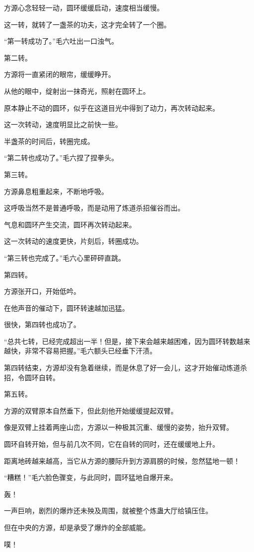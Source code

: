 \begin{this_body}
方源心念轻轻一动，圆环缓缓启动，速度相当缓慢。

这一转，就转了一盏茶的功夫，这才完全转了一个圈。

“第一转成功了。”毛六吐出一口浊气。

第二转。

方源将一直紧闭的眼帘，缓缓睁开。

从他的眼中，绽射出一抹奇光，照射在圆环上。

原本静止不动的圆环，似乎在这道目光中得到了动力，再次转动起来。

这一次转动，速度明显比之前快一些。

半盏茶的时间后，转圈完成。

“第二转也成功了。”毛六捏了捏拳头。

第三转。

方源鼻息粗重起来，不断地呼吸。

这呼吸当然不是普通呼吸，而是动用了炼道杀招催谷而出。

气息和圆环产生交流，圆环再次转动起来。

这一次转动的速度更快，片刻后，转圈成功。

“第三转也完成了。”毛六心里砰砰直跳。

第四转。

方源张开口，开始低吟。

在他声音的催动下，圆环转速越加迅猛。

很快，第四转也成功了。

“总共七转，已经完成超出一半！但是，接下来会越来越困难，因为圆环转数越来越快，非常不容易把握。”毛六额头已经垂下汗渍。

第四转结束，方源却没有急着继续，而是休息了好一会儿，这才开始催动炼道杀招，令圆环自转。

第五转。

方源的双臂原本自然垂下，但此刻他开始缓缓提起双臂。

像是双臂上挂着两座山峦，方源以一种极其沉重、缓慢的姿势，抬升双臂。

圆环自转开始，但与前几次不同，它在自转的同时，还在缓缓地上升。

距离地砖越来越高，当它从方源的腰际升到方源肩膀的时候，忽然猛地一顿！

“糟糕！”毛六脸色骤变，与此同时，圆环猛地自爆开来。

轰！

一声巨响，剧烈的爆炸还未殃及周围，就被整个炼蛊大厅给镇压住。

但在中央的方源，却是承受了爆炸的全部威能。

噗！


\end{this_body}

